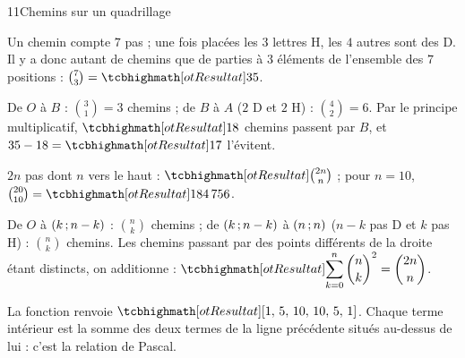 \begin{corrige}{11}{Chemins sur un quadrillage}
\begin{questions}
  \item Un chemin compte $7$ pas ; une fois placées les $3$ lettres H, les $4$ autres sont des D. Il y a donc autant de chemins que
    de parties à $3$ éléments de l'ensemble des $7$ positions : $\binom73=\res{35}$.
  \item De $O$ à $B$ : $\binom31=3$ chemins ; de $B$ à $A$ ($2$ D et $2$ H) : $\binom42=6$. Par le principe multiplicatif, $\res{18}$
    chemins passent par $B$, et $35-18=\res{17}$ l'évitent.
  \item $2n$ pas dont $n$ vers le haut : $\res{\binom{2n}{n}}$ ; pour $n=10$, $\binom{20}{10}=\res{184\,756}$.
  \item De $O$ à $(k\,{;}\, n-k)$ : $\binom nk$ chemins ; de $(k\,{;}\, n-k)$ à $(n\,{;}\, n)$ ($n-k$ pas D et $k$ pas H) : $\binom nk$ chemins.
    Les chemins passant par des points différents de la droite étant distincts, on additionne :
    $\res{\displaystyle\sum_{k=0}^{n}\binom nk^{2}=\binom{2n}{n}}$.
  \item La fonction renvoie $\res{[1,\,5,\,10,\,10,\,5,\,1]}$. Chaque terme intérieur est la somme des deux termes de la ligne
    précédente situés au-dessus de lui : c'est la relation de Pascal.
\end{questions}
\end{corrige}

